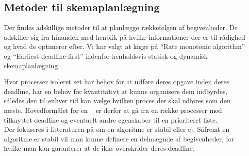 


\subsection{Metoder til skemaplanlægning}
Der findes adskillige metoder til at planlægge rækkefølgen af begivenheder. De adskiller sig fra hinanden med henblik på hvilke informationer der er til rådighed og hvad de optimerer efter. Vi har valgt at kigge på ``Rate monotonic algorithm''\cite{lehoczky1989rate,liu1973scheduling} og ``Earliest deadline first''\cite{liu1973scheduling} indenfor henholdsvis statisk og dynamisk skemaplanlægning.

Hvor processer isoleret set har behov for at udføre deres opgave inden deres deadline, har \sched en behov for kvantitativt at kunne organisere dem indbyrdes, således den til enhver tid kan vælge hvilken proces der skal udføres som den næste. Hovedformålet for en  \sched ~ er derfor at gå fra en række processer med tilknyttet deadline og eventuelt andre egenskaber til en prioriteret liste. \\
Der fokuseres i litteraturen på om en algoritme er stabil eller ej. Såfremt en algoritme er stabil vil man kunne definere en delmægnde af begivenheder, for hvilke man kan garanterer at de ikke overskrider deres deadline. 

